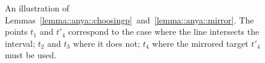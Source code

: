 \begin{figure}[tb]
  \begin{center}
    
  \end{center}
  \caption{An illustration of Lemmas~\ref{lemma::anya::choosingp}~and~\ref{lemma::anya::mirror}.  The points $t_1$ and $t'_4$ correspond to the case 
where the line intersects the interval; 
$t_2$ and $t_3$ where it does not; 
$t_4$ where the mirrored target $t'_4$ must be used.
}
\label{fig::anya::minf}
\end{figure}


